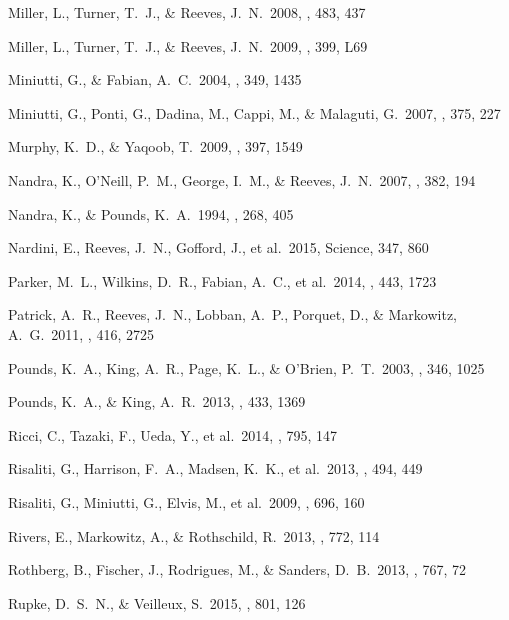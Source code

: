 \documentclass[]{emulateapj}
\begin{document}
\begin{thebibliography}{}
Miller, L., Turner, T.~J., \& Reeves, J.~N.\ 2008, \aap, 483, 437 

Miller, L., Turner, T.~J., \& Reeves, J.~N.\ 2009, \mnras, 399, L69 

Miniutti, G., \& Fabian, A.~C.\ 2004, \mnras, 349, 1435 

Miniutti, G., Ponti, G., Dadina, M., Cappi, M., \& Malaguti, G.\ 2007, \mnras, 375, 227 

Murphy, K.~D., \& Yaqoob, T.\ 2009, \mnras, 397, 1549 

Nandra, K., O'Neill, P.~M., George, I.~M., \& Reeves, J.~N.\ 2007, \mnras, 382, 194

Nandra, K., \& Pounds, K.~A.\ 1994, \mnras, 268, 405

Nardini, E., Reeves, J.~N., Gofford, J., et al.\ 2015, Science, 347, 860 

Parker, M.~L., Wilkins, D.~R., Fabian, A.~C., et al.\ 2014, \mnras, 443, 1723 

Patrick, A.~R., Reeves, J.~N., Lobban, A.~P., Porquet, D., \& Markowitz, A.~G.\ 2011, \mnras, 416, 2725 

Pounds, K.~A., King, A.~R., Page, K.~L., \& O'Brien, P.~T.\ 2003, \mnras, 346, 1025  

Pounds, K.~A., \& King, A.~R.\ 2013, \mnras, 433, 1369 
  
Ricci, C., Tazaki, F., Ueda, Y., et al.\ 2014, \apj, 795, 147 

Risaliti, G., Harrison, F.~A., Madsen, K.~K., et al.\ 2013, \nat, 494, 449 

 Risaliti, G., Miniutti, G., Elvis, M., et al.\ 2009, \apj, 696, 160 

Rivers, E., Markowitz, A., \& Rothschild, R.\ 2013, \apj, 772, 114

Rothberg, B., Fischer, J., Rodrigues, M., \& Sanders, D.~B.\ 2013, \apj, 767, 72 

Rupke, D.~S.~N., \& Veilleux, S.\ 2015, \apj, 801, 126 


\end{thebibliography}
\end{document}
